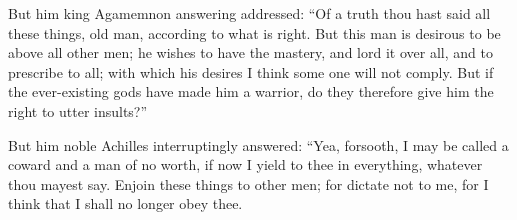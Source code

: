 \documentclass{ransom}
\begin{document}
But him king Agamemnon answering addressed: “Of a truth thou hast said
all these things, old man, according to what is right. But this man is
desirous to be above all other men; he wishes to have the mastery, and
lord it over all, and to prescribe to all; with which his desires I
think some one will not comply. But if the ever-existing gods have made
him a warrior, do they therefore give him the right to utter insults?”

But him noble Achilles interruptingly answered: “Yea, forsooth, I
may be called a coward and a man of no worth, if now I yield to thee in
everything, whatever thou mayest say. Enjoin these things to other men;
for dictate not to me, for I think that I shall no longer obey thee.\begin{vocabpage}
\begin{vocabcommon}
\\\\\\\\\\\\\\\\\\\\\\\\\\\\\\\\\\\\\\\\\\\\\\\\\\\\\\\\\\\\\end{vocabcommon}

\end{vocabpage}
\end{document}
